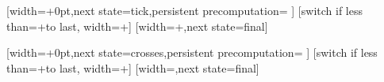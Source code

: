 %

{
  [width=+0pt,next state=tick,persistent precomputation={
    \edef\pgf@lib@dec@ol{\pgfmathresult pt}
  }]{}  
  [switch if less than=+\pgfdecorationsegmentlength to last,
               width=+\pgfdecorationsegmentlength]
  {
    \pgfpathmoveto{\pgfpointorigin}
    \pgfpathlineto{\pgfpointpolar{\pgfdecorationsegmentangle}{+\pgfdecorationsegmentamplitude}}
  }
  [width=+\pgfdecorationsegmentamplitude,next state=final]
  {
    \pgfpathmoveto{\pgfpointorigin}
    \pgfpathlineto{\pgfpointpolar{\pgfdecorationsegmentangle}{+\pgfdecorationsegmentamplitude}}
  }  
  {
    \pgfpathmoveto{\pgfpointdecoratedpathlast}
  }
}




%

{
  [width=+0pt,next state=crosses,persistent precomputation={
    \edef\pgf@lib@dec@ol{\pgfmathresult pt}
  }]{}  
  [switch if less than=+\pgfdecorationsegmentlength to last,
                   width=+\pgfdecorationsegmentlength]
  {
    \pgfpathmoveto{\pgfqpoint{0pt}{\pgfdecorationsegmentamplitude}}
    \pgfpathlineto{\pgfqpoint{\pgf@lib@dec@ol}{-\pgfdecorationsegmentamplitude}}
    \pgfpathmoveto{\pgfqpoint{0pt}{-\pgfdecorationsegmentamplitude}}
    \pgfpathlineto{\pgfqpoint{\pgf@lib@dec@ol}{\pgfdecorationsegmentamplitude}}
  }
  [width=\pgf@lib@dec@ol,next state=final]
  {
    \pgfpathmoveto{\pgfqpoint{0pt}{\pgfdecorationsegmentamplitude}}
    \pgfpathlineto{\pgfqpoint{\pgf@lib@dec@ol}{-1\pgfdecorationsegmentamplitude}}
    \pgfpathmoveto{\pgfqpoint{0pt}{-\pgfdecorationsegmentamplitude}}
    \pgfpathlineto{\pgfqpoint{\pgf@lib@dec@ol}{\pgfdecorationsegmentamplitude}}
  }
  {
    \pgfpathmoveto{\pgfpointdecoratedpathlast}
  }
}






%

